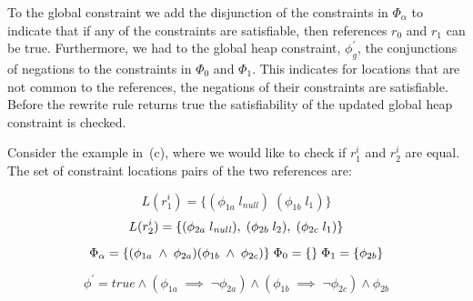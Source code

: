 To the global constraint we add the disjunction of the constraints in
$\Phi_\alpha$ to indicate that if any of the constraints are
satisfiable, then references $r_0$ and $r_1$ can be true. Furthermore,
we had to the global heap constraint, $\phi_g^\prime$, the
conjunctions of negations to the constraints in $\Phi_0$ and
$\Phi_1$. This indicates for locations that are not common to the
references, the negations of their constraints are satisfiable. Before
the rewrite rule returns true the satisfiability of the updated global
heap constraint is checked.

Consider the example in~(c), where we would like
to check if $r_1^i$ and $r_2^i$ are equal. The set of constraint locations 
pairs of the two references are: 

\[
L(r_1^i) = \{ (\phi_{1a}\; l_\mathit{null})\; (\phi_{1b}\; l_1) \} 
\]
\[
L(r_2^i) = \{ (\phi_{2a}\; l_\mathit{null}),\; (\phi_{2b}\; l_2),\; (\phi_{2c}\; l_1) \} \\
\]


\[
\Phi_\alpha = \{ (\phi_{1a}\; \wedge\; \phi_{2a} ) (\phi_{1b}\; \wedge\; \phi_{2c} ) \}\;
\Phi_0 = \{ \}\; \Phi_1 = \{ \phi_{2b}\} \\
\]

\[
\phi^\prime = \mathit{true} \wedge  (\phi_{1a}\; \implies\; \neg\phi_{2a} )\wedge (\phi_{1b}\; \implies\; \neg\phi_{2c} )  \wedge \phi_{2b}
\]

